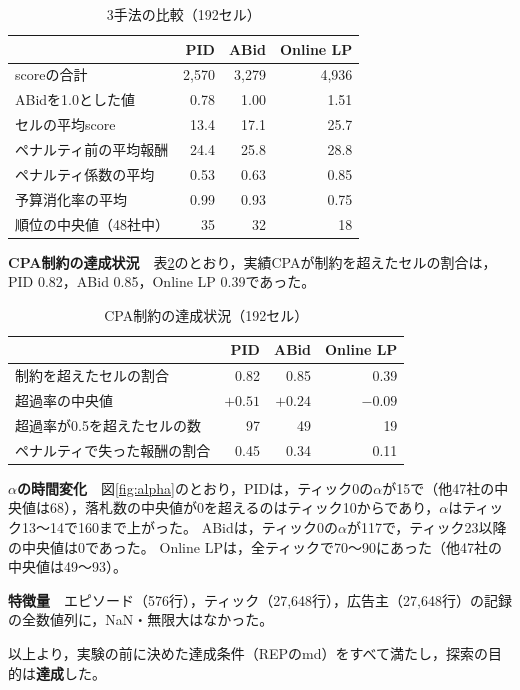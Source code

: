 \documentclass[twocolumn, 10pt]{ujarticle}
\begin{document}
\begin{table}[H]
\centering
\caption{3手法の比較（192セル）}
\label{tab:cmp}
\footnotesize
\begin{tabularx}{\linewidth}{@{}Xrrr@{}}
\toprule
 & PID & ABid & Online LP \\
\midrule
scoreの合計 & 2,570 & 3,279 & 4,936 \\
ABidを1.0とした値 & 0.78 & 1.00 & 1.51 \\
セルの平均score & 13.4 & 17.1 & 25.7 \\
ペナルティ前の平均報酬 & 24.4 & 25.8 & 28.8 \\
ペナルティ係数の平均 & 0.53 & 0.63 & 0.85 \\
予算消化率の平均 & 0.99 & 0.93 & 0.75 \\
順位の中央値（48社中） & 35 & 32 & 18 \\
\bottomrule
\end{tabularx}
\end{table}

\textbf{CPA制約の達成状況}　表\ref{tab:cpa}のとおり，実績CPAが制約を超えたセルの割合は，PID 0.82，ABid 0.85，Online LP 0.39であった。

\begin{table}[H]
\centering
\caption{CPA制約の達成状況（192セル）}
\label{tab:cpa}
\footnotesize
\begin{tabularx}{\linewidth}{@{}Xrrr@{}}
\toprule
 & PID & ABid & Online LP \\
\midrule
制約を超えたセルの割合 & 0.82 & 0.85 & 0.39 \\
超過率の中央値 & $+0.51$ & $+0.24$ & $-0.09$ \\
超過率が0.5を超えたセルの数 & 97 & 49 & 19 \\
ペナルティで失った報酬の割合 & 0.45 & 0.34 & 0.11 \\
\bottomrule
\end{tabularx}
\end{table}

\textbf{$\alpha$の時間変化}　図\ref{fig:alpha}のとおり，PIDは，ティック0の$\alpha$が15で（他47社の中央値は68），落札数の中央値が0を超えるのはティック10からであり，$\alpha$はティック13〜14で160まで上がった。
ABidは，ティック0の$\alpha$が117で，ティック23以降の中央値は0であった。
Online LPは，全ティックで70〜90にあった（他47社の中央値は49〜93）。

\textbf{特徴量}　エピソード（576行），ティック（27,648行），広告主（27,648行）の記録の全数値列に，NaN・無限大はなかった。

以上より，実験の前に決めた達成条件（REPのmd）をすべて満たし，探索の目的は\textbf{達成}した。
\end{document}
